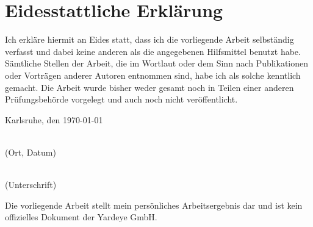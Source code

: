 \begingroup
    \let\clearpage\relax        %
    \let\cleardoublepage\relax  %

    \chapter*{Eidesstattliche Erklärung}

    Ich erkläre hiermit an Eides statt, dass ich die vorliegende Arbeit selbständig verfasst
    und dabei keine anderen als die angegebenen Hilfsmittel benutzt habe.
    Sämtliche Stellen der Arbeit, die im Wortlaut oder dem Sinn nach Publikationen
    oder Vorträgen anderer Autoren entnommen sind, habe ich als solche kenntlich gemacht.
    Die Arbeit wurde bisher weder gesamt noch in Teilen einer anderen Prüfungsbehörde
    vorgelegt und auch noch nicht veröffentlicht.\par
    \vspace{2cm}

    \begin{minipage}[h]{0.4\linewidth}
        \begin{center}
            Karlsruhe, den \today\par
            \dotfill\\
            (Ort, Datum)
            \vspace*{2.5mm}
        \end{center}
    \end{minipage}%
    \hfill%
    \begin{minipage}[h]{0.5\linewidth}
        \begin{center}
            \vspace*{5.5mm}
            \dotfill\\
            (Unterschrift)
            \vspace*{2.5mm}
        \end{center}
    \end{minipage}%

    \vfill
    Die vorliegende Arbeit stellt mein persönliches Arbeitsergebnis dar und ist kein offizielles Dokument der Yardeye GmbH.

    \vfill
    \newpage
    \thispagestyle{empty}
    \vfill

\endgroup   %
